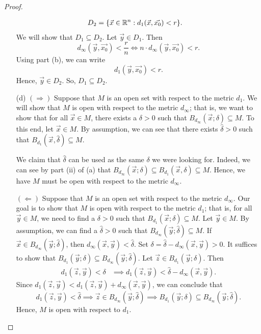 \documentclass[a4paper]{article}
\begin{document}
\begin{proof}
\begin{enumerate}
\begin{align*}
            {D}_{2}&= \{ \vec{ x }  \in \mathbb{R}^{n} : {d}_{1}(\vec{ x } , \vec{ {x}_{0} } ) < r \}.
        \end{align*}
        We will show that \( {D}_{1} \subseteq {D}_{2} \). Let \( \vec{ y }  \in {D}_{1} \). Then  
        \[  {d}_{\infty }(\vec{ y } , \vec{ {x}_{0} } ) < \frac{ r }{ n }  \iff n \cdot {d}_{\infty }(\vec{ y } , \vec{ {x}_{0} } ) < r.  \]
        Using part (b), we can write
        \[  {d}_{1}(\vec{ y } , \vec{ {x}_{0} } ) < r. \]
        Hence, \( \vec{ y }  \in {D}_{2} \). So, \( {D}_{1} \subseteq {D}_{2} \).
    \item[(d)] \( (\Longrightarrow) \) Suppose that \( M  \) is an open set with respect to the metric \( {d}_{1} \). We will show that \( M  \) is open with respect to the metric \( {d}_{\infty } \); that is, we want to show that for all \( \vec{ x  }  \in M  \), there exists a \( \delta > 0  \) such that \( B_{{d}_{\infty }}(\vec{ x } ; \delta) \subseteq  M  \). To this end, let \( \vec{  x  }  \in M \). By assumption, we can see that there exists \( \hat{\delta} > 0  \) such that \( {B}_{{d}_{1}}(\vec{ x } , \hat{\delta}) \subseteq M  \).

        We claim that \( \hat{\delta} \) can be used as the same \( \delta \) we were looking for. Indeed, we can see by part (ii) of (a) that \( {B}_{{d}_{\infty}}(\vec{ x } ; \delta) \subseteq {B}_{{d}_{1}}(\vec{ x }, \delta ) \subseteq M    \). Hence, we have \( M  \) must be open with respect to the metric \( {d}_{\infty }  \).

        \( (\Longleftarrow) \) Suppose that \( M  \) is an open set with respect to the metric \( {d}_{\infty } \). Our goal is to show that \( M \) is open with respect to the metric \( {d}_{1} \); that is, for all \( \vec{ y }  \in M \), we need to find a \( \delta > 0  \) such that \( B_{{d}_{1}}(\vec{ x } ; \delta ) \subseteq  M  \). Let \( \vec{ y }  \in M  \). By assumption, we can find a \( \hat{\delta} > 0  \) such that \( {B}_{{d}_{\infty }}(\vec{ y } ; \hat{\delta}) \subseteq  M \). If \( \vec{ x } \in {B}_{{d}_{\infty }}(\vec{ y } ; \hat{\delta})  \), then \( {d}_{\infty }(\vec{ x } , \vec{ y } ) < \hat{\delta} \). Set \( \delta = \hat{\delta} - {d}_{\infty }(\vec{ x } , \vec{ y } ) > 0  \). It suffices to show that \( {B}_{{d}_{1}}(\vec{ y } ; \delta) \subseteq {B}_{{d}_{\infty }} (\vec{ y } ; \hat{\delta})  \). Let \(  \vec{ z }  \in {B}_{{d}_{1}}(\vec{ y } ; \delta )  \). Then
        \begin{align*}
            {d}_{1}(\vec{ z } , \vec{ y } ) < \delta &\implies {d}_{1}(\vec{ z } , \vec{ y } ) < \hat{\delta} - {d}_{\infty }(\vec{ x } , \vec{ y } ).
        \end{align*}
        Since \( {d}_{1}(\vec{ z } , \vec{ y } ) < {d}_{1}(\vec{ z } ,\vec{ y } ) + {d}_{\infty }(\vec{ x } , \vec{ y } ) \), we can conclude that \[  {d}_{1}(\vec{ z } , \vec{ y } ) < \hat{\delta} \implies \vec{ z }  \in {B}_{{d}_{\infty }}(\vec{ y }; \hat{\delta} ) \implies {B}_{{d}_{1}}(\vec{ y  }  ; \delta) \subseteq {B}_{{d}_{\infty }}(\vec{ y } ; \hat{\delta}). \] 
        Hence, \( M  \) is open with respect to \( {d}_{1} \).
\end{enumerate}
\end{proof}
\end{document}
